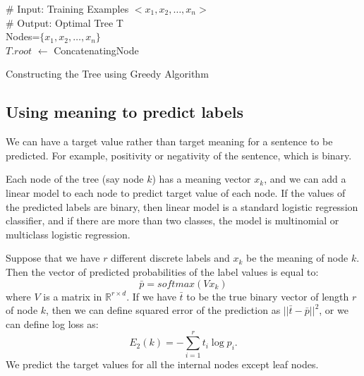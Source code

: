 \documentclass[twoside,12pt]{article}
\begin{document}
\begin{algorithm}[h!]
\# Input: Training Examples $<x_1, x_2, \ldots, x_n>$\\ 
\# Output: Optimal Tree T\\
Nodes=$\{x_1,x_2,\ldots,x_n\}$\\
$T.root$ $\leftarrow$ ConcatenatingNode
\caption{Constructing the Tree using Greedy Algorithm}
\label{algorithm tree}
\end{algorithm}
 
\subsection{Using meaning to predict labels}
We can have a target value rather than target meaning for a sentence to be predicted. For example, positivity or negativity of the sentence, which is binary. 

Each node of the tree (say node $k$) has a meaning vector $x_k$, and we can add a linear model to each node to predict target value of each node. If the values of the predicted labels are binary, then linear model is a standard logistic regression classifier, and if there are more than two classes, the model is multinomial or multiclass logistic regression.

Suppose that we have $r$ different discrete labels and $x_k$ be the meaning of node $k$. Then the vector of predicted probabilities of the label values is equal to:
\begin{equation}
\bar{p}=softmax(Vx_k)
\end{equation}
where $V$ is a matrix in $\mathbb{R}^{r\times d}$. If we have $\bar{t}$ to be the true binary vector of length $r$ of node $k$, then we can define squared error of the prediction as $||\bar{t}-\bar{p}||^2$, or we can define log loss as:
\begin{equation}
E_2(k)=-\sum_{i=1}^{r}t_i\log{p_i}.
\end{equation}
We predict the target values for all the internal nodes except leaf nodes. 
\end{document}

